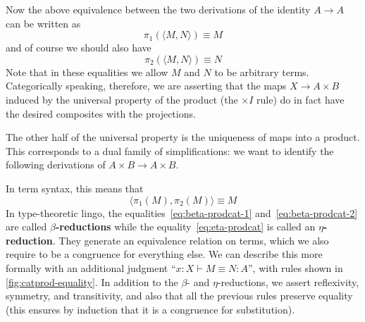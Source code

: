 \documentclass{book}
\let\types\vdash
\def\timesI{\ensuremath{\mathord{\times}I}}
\def\pair#1#2{\langle #1,#2\rangle}
\begin{document}
Now the above equivalence between the two derivations of the identity $A\to A$ can be written as
\begin{equation}
  \pi_1(\pair M N) \equiv M\label{eq:beta-prodcat-1}
\end{equation}
and of course we should also have
\begin{equation}
  \pi_2(\pair M N) \equiv N\label{eq:beta-prodcat-2}
\end{equation}
Note that in these equalities we allow $M$ and $N$ to be arbitrary terms.
Categorically speaking, therefore, we are asserting that the maps $X\to A\times B$ induced by the universal property of the product (the $\timesI$ rule) do in fact have the desired composites with the projections.

The other half of the universal property is the uniqueness of maps into a product.
This corresponds to a dual family of simplifications: we want to identify the following derivations of $A\times B\to A\times B$.
In term syntax, this means that
\begin{equation}
  \pair{\pi_1(M)}{\pi_2(M)} \equiv M\label{eq:eta-prodcat}
\end{equation}
In type-theoretic lingo, the equalities~\eqref{eq:beta-prodcat-1} and~\eqref{eq:beta-prodcat-2} are called \textbf{$\beta$-reductions} while the equality~\eqref{eq:eta-prodcat} is called an \textbf{$\eta$-reduction}.
They generate an equivalence relation on terms, which we also require to be a congruence for everything else.
We can describe this more formally with an additional judgment ``$x:X\types M\equiv N :A$'', with rules shown in  \cref{fig:catprod-equality}.
In addition to the $\beta$- and $\eta$-reductions, we assert reflexivity, symmetry, and transitivity, and also that all the previous rules preserve equality (this ensures by induction that it is a congruence for substitution).
\end{document}
